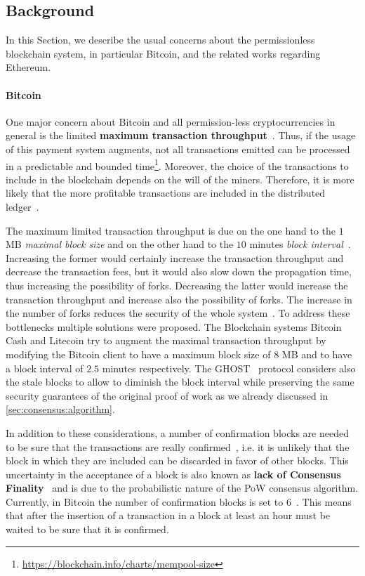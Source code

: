 \subsection{Background}
\label{sec:background}

In this Section, we describe the usual concerns about the permissionless
blockchain system, in particular Bitcoin, and the related works regarding
Ethereum.

\paragraph{Bitcoin}
One major concern about Bitcoin and all permission-less cryptocurrencies in
general is the limited \textbf{maximum transaction
throughput}~\cite{bib:blockchain-challenges-opportunites-survey, bib:taxonomy,
bib:scaling-croman}. Thus, if the usage of this payment system augments, not all
transactions emitted can be processed in a predictable and bounded
time\footnote{\url{https://blockchain.info/charts/mempool-size}}. Moreover, the
choice of the transactions to include in the blockchain depends on the will of
the miners. Therefore, it is more likely that the more profitable transactions
are included in the distributed
ledger~\cite{bib:blockchain-challenges-opportunites-survey,wood2018ethereum}.

The maximum limited transaction throughput is due on the one hand to the $1$ MB
\emph{maximal block size} and on the other hand to the $10$ minutes \emph{block
interval}~\cite{bib:ghost, bib:scaling-croman}. Increasing the former would
certainly increase the transaction throughput and decrease the transaction fees,
but it would also slow down the propagation time, thus increasing the
possibility of forks. Decreasing the latter would increase the transaction
throughput and increase also the possibility of forks. The increase in the
number of forks reduces the security of the whole system~\cite{bib:ghost}. To
address these bottlenecks multiple solutions were proposed. The Blockchain
systems Bitcoin Cash and Litecoin try to augment the maximal transaction
throughput by modifying the Bitcoin client to have a maximum block size of $8$
MB and to have a block interval of $2.5$ minutes respectively. The
GHOST~\cite{bib:ghost} protocol considers also the stale blocks to allow to
diminish the block interval while preserving the same security guarantees of the
original proof of work as we already discussed in
\autoref{sec:consensus:algorithm}.

In addition to these considerations, a number of confirmation blocks are needed
to be sure that the transactions are really confirmed~\cite{bib:taxonomy}, i.e.
it is unlikely that the block in which they are included can be discarded in
favor of other blocks. This uncertainty in the acceptance of a block is also
known as \textbf{lack of Consensus Finality}~\cite{bib:the-quest} and is due to
the probabilistic nature of the PoW consensus algorithm. Currently, in Bitcoin
the number of confirmation blocks is set to $6$~\cite{bib:masteringbitcoin}.
This means that after the insertion of a transaction in a block at least an hour
must be waited to be sure that it is confirmed.

